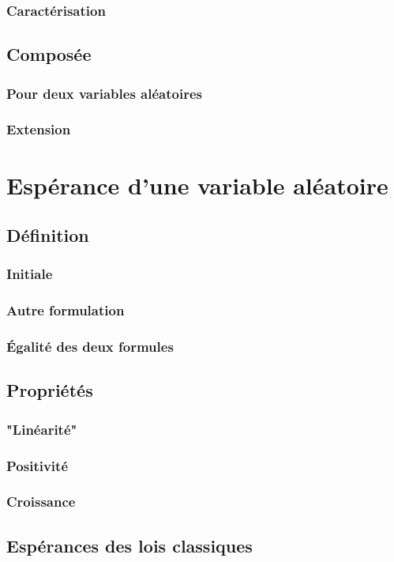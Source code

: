 \documentclass[12pt,a4paper,french]{book}
\begin{document}
			\subsubsection{Caractérisation}
		\subsection{Composée}
			\subsubsection{Pour deux variables aléatoires}
			\subsubsection{Extension}
	\section{Espérance d'une variable aléatoire}
		\subsection{Définition}
			\subsubsection{Initiale}
			\subsubsection{Autre formulation}
			\subsubsection{Égalité des deux formules}
		\subsection{Propriétés}
			\subsubsection{"Linéarité"}
			\subsubsection{Positivité}
			\subsubsection{Croissance}
		\subsection{Espérances des lois classiques}
\end{document}
